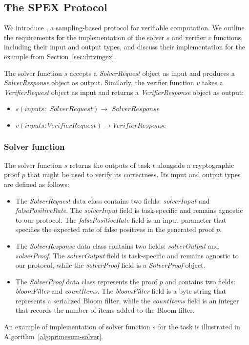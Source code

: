 \documentclass[sigconf, nonacm]{acmart}
\begin{document}
\subsection{The SPEX Protocol}
\label{sec:spex}

We introduce , a sampling-based protocol for verifiable computation.
We outline the requirements for the implementation of the solver $s$ and verifier $v$ functions, including their input and output types, and discuss their implementation for the  example from Section~\ref{sec:drivingex}.

The solver function $s$ accepts a \textit{SolverRequest} object as input and produces a \textit{SolverResponse} object as output. Similarly, the verifier function $v$ takes a \textit{VerifierRequest} object as input and returns a \textit{VerifierResponse} object as output:

\begin{itemize}
  \item $s(inputs: \textit{ SolverRequest}) \rightarrow \textit{ SolverResponse}$
  \item $v(inputs: \textit{VerifierRequest}) \rightarrow \textit{VerifierResponse}$
\end{itemize}

\subsubsection{Solver function}

The solver function $s$ returns the outputs of task $t$ alongside a cryptographic proof $p$ that might be used to verify its correctness. Its input and output types are defined as follows:

\begin{itemize}
  \item The \textit{SolverRequest} data class contains two fields: \textit{solverInput} and \textit{falsePositiveRate}. The \textit{solverInput} field is task-specific and remains agnostic to our protocol. The \textit{falsePositiveRate} field is an input parameter that specifies the expected rate of false positives in the generated proof $p$.
  \item The \textit{SolverResponse} data class contains two fields: \textit{solverOutput} and \textit{solverProof}. The \textit{solverOutput} field is task-specific and remains agnostic to our protocol, while the \textit{ solverProof} field is a \textit{SolverProof} object.
  \item The \textit{SolverProof} data class represents the proof $p$ and contains two fields: \textit{bloomFilter} and \textit{countItems}. The \textit{bloomFilter} field is a byte string that represents a serialized Bloom filter, while the \textit{countItems} field is an integer that records the number of items added to the Bloom filter.
\end{itemize}
An example of implementation of solver function $s$ for the  task is illustrated in Algorithm~\ref{alg:primesum-solver}.
\end{document}
